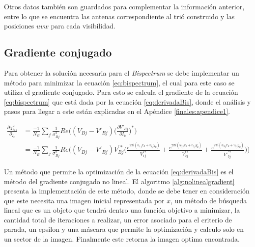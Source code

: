Otros datos también son guardados para complementar la información anterior, entre lo que se encuentra las antenas correspondiente al trió construido y las posiciones $uvw$ para cada visibilidad.  

\subsection{Gradiente conjugado}

Para obtener la solución necesaria para el \textit{Bispectrum} se debe implementar un método para minimizar la ecuación \ref{eq:bispectrum}, el cual para este caso se utiliza el gradiente conjugado. Para esto se calcula el gradiente de la ecuación \ref{eq:bispectrum} que está dada por la ecuación \ref{eq:derivadaBis}, donde el análisis y pasos para llegar a este están explicadas en el Apéndice \ref{finales:apendice1}.

\begin{equation}
    \begin{split}
        \frac{\partial{\chi^{2}_{bis}}}{\partial_{I_{k}}} &= \frac{-1}{N_{B}} \sum_{j} \frac{1}{\sigma^{2}_{Bj}} Re\bigg((V_{Bj} - V'_{Bj}) \bigg( \frac{\partial{V'_{Bj}}}{\partial{I_{k}}} \bigg)^{*} \bigg) \\
        &= \frac{-1}{N_{B}} \sum_{j} \frac{1}{\sigma^{2}_{Bj}} Re\bigg((V_{Bj} - V'_{Bj}) V^{'*}_{Bj} \bigg( \frac{e^{2\pi i (u_{1j}x_{k} + v_{1j}y_{k})}}{V^{'*}_{1j}} + \frac{e^{2\pi i (u_{2j}x_{k} + v_{2j}y_{k})}}{V^{'*}_{2j}} + \frac{e^{2\pi i (u_{3j}x_{k} + v_{3j}y_{k})}}{V'^{'*}_{3j}}\bigg) \bigg) 
    \end{split}
    \label{eq:derivadaBis}
\end{equation}

Un método que permite la optimización de la ecuación \ref{eq:derivadaBis} es el método del gradiente conjugado no lineal. El algoritmo \ref{alg:nolinealgradient} presenta la implementación de este método, donde se debe tener en consideración que este necesita una imagen inicial representada por $x$, un método de búsqueda lineal que es un objeto que tendrá dentro una función objetivo a minimizar, la cantidad total de iteraciones a realizar, un error asociado para el criterio de parada, un epsilon y una máscara que permite la optimización y calculo solo en un sector de la imagen. Finalmente este retorna la imagen optima encontrada. 


